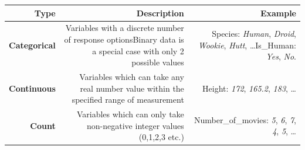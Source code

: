 \documentclass[]{book}
\begin{document}
\begin{longtable}[]{@{}rrr@{}}
\toprule
\begin{minipage}[b]{0.30\columnwidth}\raggedleft
\textbf{Type}\strut
\end{minipage} & \begin{minipage}[b]{0.30\columnwidth}\raggedleft
\textbf{Description}\strut
\end{minipage} & \begin{minipage}[b]{0.30\columnwidth}\raggedleft
\textbf{Example}\strut
\end{minipage}\tabularnewline
\midrule
\endhead
\begin{minipage}[t]{0.30\columnwidth}\raggedleft
\textbf{Categorical}\strut
\end{minipage} & \begin{minipage}[t]{0.30\columnwidth}\raggedleft
Variables with a discrete number of response optionsBinary data is a special case with only 2 possible values\strut
\end{minipage} & \begin{minipage}[t]{0.30\columnwidth}\raggedleft
Species: \emph{Human}, \emph{Droid}, \emph{Wookie}, \emph{Hutt}, \ldots{}Is\_Human: \emph{Yes}, \emph{No}.\strut
\end{minipage}\tabularnewline
\begin{minipage}[t]{0.30\columnwidth}\raggedleft
\textbf{Continuous}\strut
\end{minipage} & \begin{minipage}[t]{0.30\columnwidth}\raggedleft
Variables which can take any real number value within the specified range of measurement\strut
\end{minipage} & \begin{minipage}[t]{0.30\columnwidth}\raggedleft
Height: \emph{172}, \emph{165.2}, \emph{183}, \ldots{}\strut
\end{minipage}\tabularnewline
\begin{minipage}[t]{0.30\columnwidth}\raggedleft
\textbf{Count}\strut
\end{minipage} & \begin{minipage}[t]{0.30\columnwidth}\raggedleft
Variables which can only take non-negative integer values (0,1,2,3 etc.)\strut
\end{minipage} & \begin{minipage}[t]{0.30\columnwidth}\raggedleft
Number\_of\_movies: \emph{5}, \emph{6}, \emph{7}, \emph{4}, \emph{5}, \ldots{}\strut
\end{minipage}\tabularnewline
\bottomrule
\end{longtable}
\end{document}
